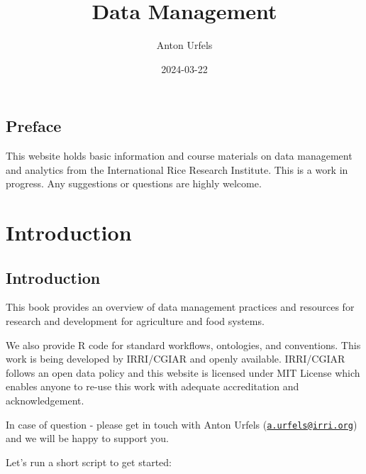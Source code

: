 \documentclass[
  letterpaper,
  DIV=11,
  numbers=noendperiod]{scrreprt}
\title{Data Management}
\author{Anton Urfels}
\date{2024-03-22}
\renewcommand*\contentsname{Table of contents}
\newcommand\contentsname{Table of contents}
\begin{document}
\maketitle
\ifdefined\Shaded\renewenvironment{Shaded}{\begin{tcolorbox}[interior hidden, boxrule=0pt, sharp corners, frame hidden, borderline west={3pt}{0pt}{shadecolor}, enhanced, breakable]}{\end{tcolorbox}}\fi

\renewcommand*\contentsname{Table of contents}
{
\hypersetup{linkcolor=}
\setcounter{tocdepth}{2}
\tableofcontents
}

\hypertarget{preface}{%
\chapter*{Preface}\label{preface}}


This website holds basic information and course materials on data
management and analytics from the International Rice Research Institute.
This is a work in progress. Any suggestions or questions are highly
welcome.

\part{Introduction}

\hypertarget{introduction-1}{%
\chapter{Introduction}\label{introduction-1}}

This book provides an overview of data management practices and
resources for research and development for agriculture and food systems.

We also provide R code for standard workflows, ontologies, and
conventions. This work is being developed by IRRI/CGIAR and openly
available. IRRI/CGIAR follows an open data policy and this website is
licensed under MIT License which enables anyone to re-use this work with
adequate accreditation and acknowledgement.

In case of question - please get in touch with Anton Urfels
(\href{mailto:a.urfels@irri.org}{\nolinkurl{a.urfels@irri.org}}) and we
will be happy to support you.

Let's run a short script to get started:
\end{document}
